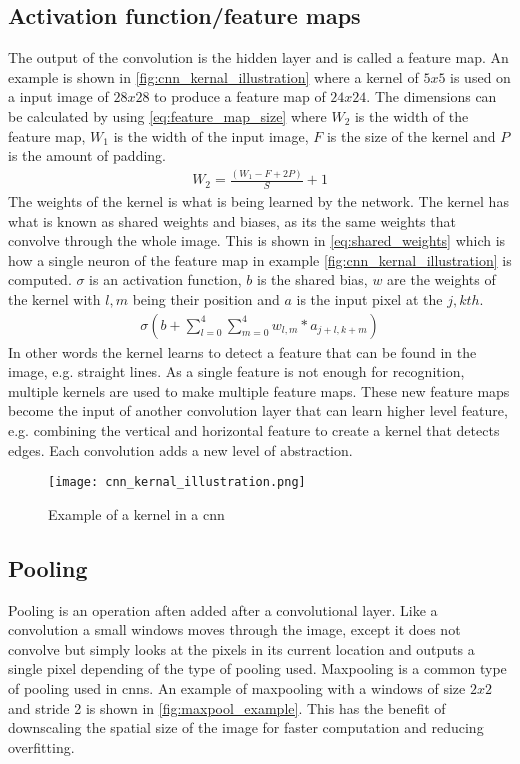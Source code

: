 \subsection{Activation function/feature maps}
The output of the convolution is the hidden layer and is called a feature map. An example is shown in \autoref{fig:cnn_kernal_illustration} where a kernel of $5x5$ is used on a input image of $28x28$ to produce a feature map of $24x24$. The dimensions can be calculated by using \autoref{eq:feature_map_size}  where $W_2$ is the width of the feature map, $W_1$ is the width of the input image, $F$ is the size of the kernel and $P$ is the amount of padding.  
\begin{eqnarray}
\label{eq:feature_map_size}
W_2 = \frac{(W_1-F+2P)}{S} +1
\end{eqnarray}
The weights of the kernel is what is being learned by the network. The kernel has what is known as shared weights and biases, as its the same weights that convolve through the whole image. This is shown in \autoref{eq:shared_weights} which is how a single neuron of the feature map in example \autoref{fig:cnn_kernal_illustration} is computed. $\sigma$ is an activation function, $b$ is the shared bias,  $w$ are the weights of the kernel with $l,m$ being their position and $a$ is the input pixel at the $j,kth$.
\begin{eqnarray}
\label{eq:shared_weights}
\sigma(b+\sum\limits_{l=0}^4 \sum\limits_{m=0}^4 w_{l,m}*a_{j+l,k+m})
\end{eqnarray}
\noindent
In other words the kernel learns to detect a feature that can be found in the image, e.g. straight lines. As a single feature is not enough for recognition, multiple kernels are used to make multiple feature maps. These new feature maps become the input of another convolution layer that can learn higher level feature, e.g. combining the vertical and horizontal feature to create a kernel that detects edges. Each convolution adds a new level of abstraction.

\begin{figure}[h]
\centering
\texttt{[image: cnn\_kernal\_illustration.png]}
\caption{Example of a kernel in a \gls{cnn} \citep{Nielsen2015}}
\label{fig:cnn_kernal_illustration}
\end{figure}
\subsection{Pooling}
Pooling is an operation aften added after a convolutional layer. Like a convolution a small windows moves through the image, except it does not convolve but simply looks at the pixels in its current location and outputs a single pixel depending of the type of pooling used. Maxpooling is a common type of pooling used in \gls{cnn}s. An example of maxpooling with a windows of size $2x2$ and stride 2  is shown in \autoref{fig:maxpool_example}. This has the benefit of downscaling the spatial size of the image for faster computation and reducing overfitting.

